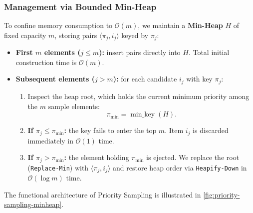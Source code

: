 \subsubsection{Management via Bounded Min-Heap}
To confine memory consumption to $\mathcal{O}(m)$, we maintain a \textbf{Min-Heap} $H$ of fixed capacity $m$, storing pairs $\langle \pi_j, i_j \rangle$ keyed by $\pi_j$:
\begin{itemize}
  \item \textbf{First $m$ elements ($j \le m$):} insert pairs directly into $H$. Total initial construction time is $\mathcal{O}(m)$.
  \item \textbf{Subsequent elements ($j > m$):} for each candidate $i_j$ with key $\pi_j$:
  \begin{enumerate}
    \item Inspect the heap root, which holds the current minimum priority among the $m$ sample elements:
    \begin{equation}
      \pi_{\min} = \operatorname{min\_key}(H).
    \end{equation}
    \item \textbf{If $\pi_j \le \pi_{\min}$:} the key fails to enter the top $m$. Item $i_j$ is discarded immediately in $\mathcal{O}(1)$ time.
    \item \textbf{If $\pi_j > \pi_{\min}$:} the element holding $\pi_{\min}$ is ejected. We replace the root (\texttt{Replace-Min}) with $\langle \pi_j, i_j \rangle$ and restore heap order via \texttt{Heapify-Down} in $\mathcal{O}(\log m)$ time.
  \end{enumerate}
\end{itemize}

The functional architecture of Priority Sampling is illustrated in \autoref{fig:priority-sampling-minheap}.

